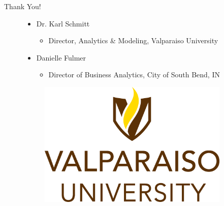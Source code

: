 \documentclass{beamer}
\begin{document}
\begin{frame}

\begin{center}
	{\Huge Thank You!} \\ %
	\begin{figure}
		\begin{minipage}[t]{0.48\textwidth}
			\centering
			\begin{itemize}
				\item Dr. Karl Schmitt
				\begin{itemize}
					\item Director, Analytics \& Modeling, Valparaiso University
				\end{itemize}
				\item Danielle Fulmer
				\begin{itemize}
					\item Director of Business Analytics, City of South Bend, IN
				\end{itemize}
			\end{itemize} 
		\end{minipage}\hfill
		\begin{minipage}[t]{0.48\textwidth}
			\centering
			\begin{figure}
				\includegraphics[scale = 0.25]{Valpo}
			\end{figure}

\end{minipage}
\end{figure}
\end{center}
\end{frame}
\end{document}
